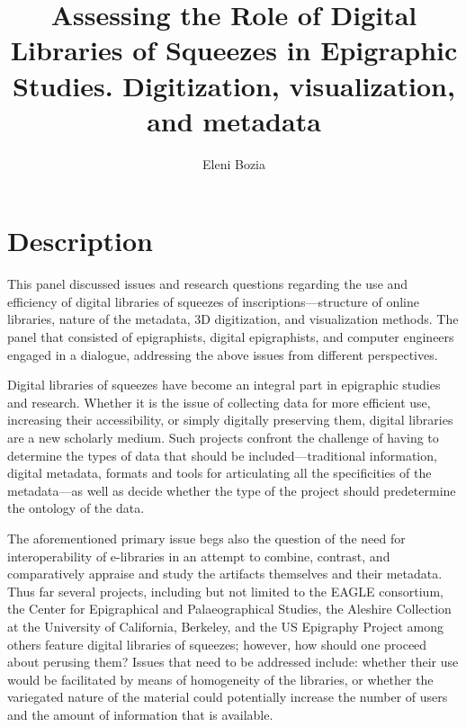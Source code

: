 \documentclass[amsthm,ebook]{saparticle}
\title{Assessing the Role of Digital Libraries of Squeezes in Epigraphic Studies. Digitization, visualization, and metadata}
\author[Flo]{Eleni Bozia\corref{first}}
\begin{document}
\maketitle


\section{Description}
This panel discussed issues and research questions regarding the use and efficiency of digital libraries of squeezes of inscriptions—structure of online libraries, nature of the metadata, 3D digitization, and visualization methods. The panel that consisted of epigraphists, digital epigraphists, and computer engineers engaged in a dialogue, addressing the above issues from different perspectives.

Digital libraries of squeezes have become an integral part in epigraphic studies and research. Whether it is the issue of collecting data for more efficient use, increasing their accessibility, or simply digitally preserving them, digital libraries are a new scholarly medium. Such projects confront the challenge of having to determine the types of data that should be included—traditional information, digital metadata, formats and tools for articulating all the specificities of the metadata—as well as decide whether the type of the project should predetermine the ontology of the data.

The aforementioned primary issue begs also the question of the need for interoperability of e-libraries in an attempt to combine, contrast, and comparatively appraise and study the artifacts themselves and their metadata. Thus far several projects, including but not limited to the EAGLE consortium, the Center for Epigraphical and Palaeographical Studies, the Aleshire Collection at the University of California, Berkeley, and the US Epigraphy Project among others feature digital libraries of squeezes; however, how should one proceed about perusing them? Issues that need to be addressed include: whether their use would be facilitated by means of homogeneity of the libraries, or whether the variegated nature of the material could potentially increase the number of users and the amount of information that is available.
\end{document}
